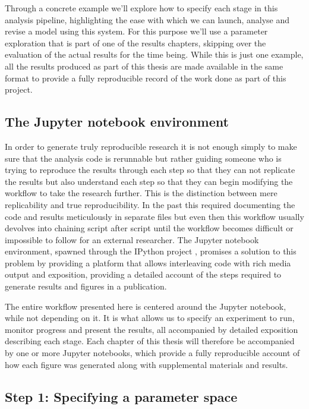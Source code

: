 Through a concrete example we'll explore how to specify each stage in
this analysis pipeline, highlighting the ease with which we can
launch, analyse and revise a model using this system. For this purpose
we'll use a parameter exploration that is part of one of the results
chapters, skipping over the evaluation of the actual results for the
time being. While this is just one example, all the results produced
as part of this thesis are made available in the same format to
provide a fully reproducible record of the work done as part of this
project.

\subsection{The Jupyter notebook environment}

In order to generate truly reproducible research it is not enough
simply to make sure that the analysis code is rerunnable but rather
guiding someone who is trying to reproduce the results through each
step so that they can not replicate the results but also understand
each step so that they can begin modifying the workflow to take the
research further. This is the distinction between mere replicability
and true reproducibility. In the past this required documenting the
code and results meticulously in separate files but even then this
workflow usually devolves into chaining script after script until the
workflow becomes difficult or impossible to follow for an external
researcher. The Jupyter notebook environment, spawned through the
IPython project \citep{Perez2007}, promises a solution to this problem
by providing a platform that allows interleaving code with rich media
output and exposition, providing a detailed account of the steps
required to generate results and figures in a publication.

The entire workflow presented here is centered around the Jupyter
notebook, while not depending on it. It is what allows us to specify
an experiment to run, monitor progress and present the results, all
accompanied by detailed exposition describing each stage. Each chapter
of this thesis will therefore be accompanied by one or more Jupyter
notebooks, which provide a fully reproducible account of how each
figure was generated along with supplemental materials and results.

\subsection{Step 1: Specifying a parameter space}

